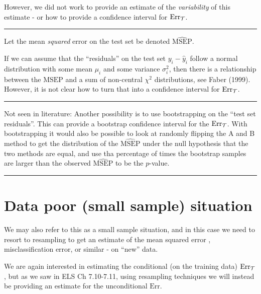 \documentclass[
  letterpaper,
  DIV=11,
  numbers=noendperiod]{scrartcl}
\begin{document}
However, we did not work to provide an estimate of the
\emph{variability} of this estimate - or how to provide a confidence
interval for \(\text{Err}_{\cal T}\).

\begin{center}\rule{0.5\linewidth}{0.5pt}\end{center}

Let the mean \emph{squared} error on the test set be denoted
\(\widehat{\text{MSEP}}\).

If we can assume that the ``residuals'' on the test set
\(y_i-\hat{y}_i\) follow a normal distribution with some mean \(\mu_i\)
and some variance \(\sigma_i^2\), then there is a relationship between
the \(\widehat{\text{MSEP}}\) and a sum of non-central \(\chi^2\)
distributions, see Faber (1999). However, it is not clear how to turn
that into a confidence interval for \(\text{Err}_{\cal T}\).

\begin{center}\rule{0.5\linewidth}{0.5pt}\end{center}

Not seen in literature: Another possibility is to use bootstrapping on
the ``test set residuals''. This can provide a bootstrap confidence
interval for the \(\text{Err}_{\cal T}\). With bootstrapping it would
also be possible to look at randomly flipping the A and B method to get
the distribution of the \(\widehat{\text{MSEP}}\) under the null
hypothesis that the two methods are equal, and use tha percentage of
times the bootstrap samples are larger than the observed
\(\widehat{\text{MSEP}}\) to be the \(p\)-value.

\begin{center}\rule{0.5\linewidth}{0.5pt}\end{center}

\hypertarget{data-poor-small-sample-situation}{%
\section{Data poor (small sample)
situation}\label{data-poor-small-sample-situation}}

We may also refer to this as a small sample situation, and in this case
we need to resort to resampling to get an estimate of the mean squared
error , misclassification error, or similar - on ``new'' data.

We are again interested in estimating the conditional (on the training
data) \(\text{Err}_{\cal T}\), but as we saw in ELS Ch 7.10-7.11, using
resampling techniques we will instead be providing an estimate for the
unconditional \(\text{Err}\).
\end{document}
